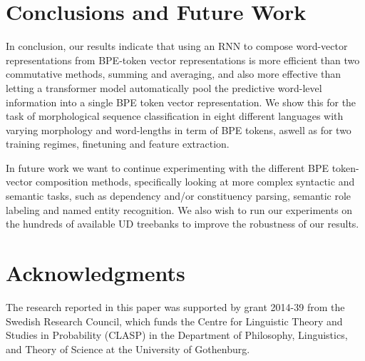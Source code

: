 \documentclass[11pt]{article}
\begin{document}
    

    \section{Conclusions and Future Work}



        In conclusion, our results indicate that using an RNN to
     compose word-vector representations from BPE-token vector
     representations is more efficient than two commutative methods,
     summing and averaging, and also more effective than letting a
     transformer model automatically pool the predictive word-level
     information into a single BPE token vector representation.
        We show this for the task of morphological sequence
     classification in eight different languages with varying
     morphology and word-lengths in term of BPE tokens, aswell as for
     two training regimes, finetuning and feature extraction.

     
    In future work we want to continue experimenting with the different
    BPE token-vector composition methods, specifically looking at more complex
    syntactic and semantic tasks, such as dependency and/or
    constituency parsing, semantic role labeling and named entity recognition. 
            We also wish to run our experiments on the hundreds of
     available UD treebanks to improve the robustness of our results.
    
	\section*{Acknowledgments}
            The research reported in this paper was supported by grant
     2014-39 from the Swedish Research Council, which funds the Centre
     for Linguistic Theory and Studies in Probability (CLASP) in the
     Department of Philosophy, Linguistics, and Theory of Science at
     the University of Gothenburg.

	
	
	
\end{document}

